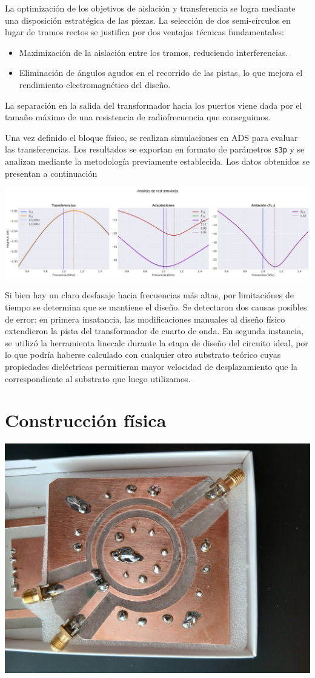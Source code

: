 \documentclass[a4paper, 12pt]{article}
\begin{document}
La optimización de los objetivos de aislación y transferencia se logra mediante una disposición estratégica de las piezas. La selección de dos semi-círculos en lugar de tramos rectos se justifica por dos ventajas técnicas fundamentales:
\begin{itemize}
    \item Maximización de la aislación entre los tramos, reduciendo interferencias.
    \item Eliminación de ángulos agudos en el recorrido de las pistas, lo que mejora el rendimiento electromagnético del diseño.
\end{itemize}
La separación en la salida del transformador hacia los puertos viene dada por el tamaño máximo de una resistencia de radiofrecuencia que conseguimos.

Una vez definido el bloque físico, se realizan simulaciones en ADS para evaluar las transferencias. Los resultados se exportan en formato de parámetros \texttt{s3p} y se analizan mediante la metodología previamente establecida. Los datos obtenidos se presentan a continuación

\includegraphics[width=0.9\linewidth]{./img/plot-simulado.png}

Si bien hay un claro desfasaje hacia frecuencias más altas, por limitaciónes de tiempo se determina que se mantiene el diseño.
Se detectaron dos causas posibles de error: en primera insatancia, las modificaciones manuales al diseño físico extendieron la pista del transformador de cuarto de onda. En segunda instancia, se utilizó la herramienta linecalc durante la etapa de diseño del circuito ideal, por lo que podría haberse calculado con cualquier otro substrato teórico cuyas propiedades dieléctricas permitieran mayor velocidad de desplazamiento que la correspondiente al substrato que luego utilizamos.

\section*{Construcción física}

\begin{center}
\includegraphics[width=0.7\linewidth]{./img/real.jpg}
\end{center}
\end{document}
